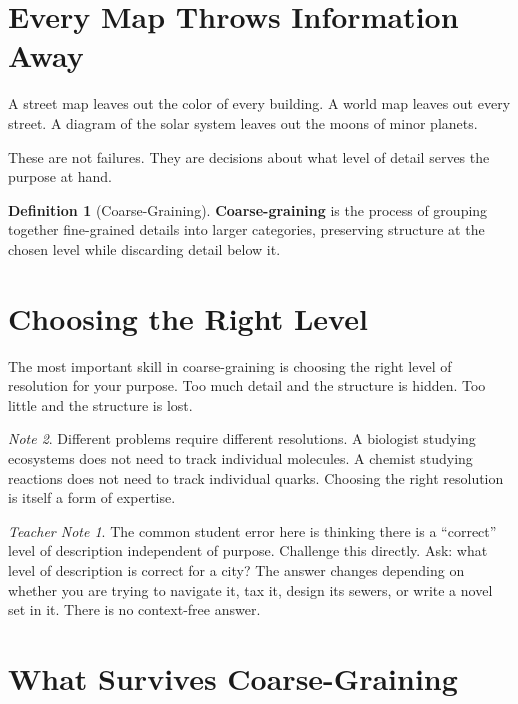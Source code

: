 \documentclass[11pt]{book}
\theoremstyle{definition}
\newtheorem{definition}{Definition}[chapter]
\theoremstyle{remark}
\newtheorem{remark}[definition]{Note}
\newtheorem{teachernote}{Teacher Note}[chapter]
\begin{document}
\section{Every Map Throws Information Away}

A street map leaves out the color of every building. A world map leaves
out every street. A diagram of the solar system leaves out the moons of
minor planets.

These are not failures. They are decisions about what level of detail serves
the purpose at hand.

\begin{definition}[Coarse-Graining]
\textbf{Coarse-graining} is the process of grouping together fine-grained
details into larger categories, preserving structure at the chosen level
while discarding detail below it.
\end{definition}

\section{Choosing the Right Level}

The most important skill in coarse-graining is choosing the right level of
resolution for your purpose. Too much detail and the structure is hidden.
Too little and the structure is lost.

\begin{remark}
Different problems require different resolutions. A biologist studying
ecosystems does not need to track individual molecules. A chemist studying
reactions does not need to track individual quarks. Choosing the right
resolution is itself a form of expertise.
\end{remark}

\begin{teachernote}
The common student error here is thinking there is a ``correct'' level
of description independent of purpose. Challenge this directly. Ask:
what level of description is correct for a city? The answer changes
depending on whether you are trying to navigate it, tax it, design its
sewers, or write a novel set in it. There is no context-free answer.
\end{teachernote}

\section{What Survives Coarse-Graining}
\end{document}
